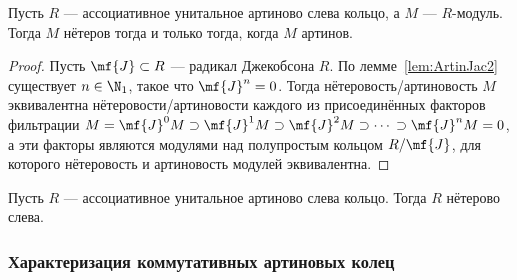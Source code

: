 \documentclass[
	extrafontsizes,
	11pt,
	hyphens,
]{memoir}
\begin{document}
%

\begin{theorem}
Пусть \(R\) --- ассоциативное унитальное артиново слева кольцо, а \(M\) --- \(R\)-мо\-дуль.
Тогда \(M\) нётеров тогда и только тогда, когда \(M\) артинов.
\end{theorem}

\begin{proof}
Пусть \(\mf{J} \subset R\) --- радикал Джекобсона \(R\).
По лемме~\ref{lem:ArtinJac2} существует \(n \in \N_1\), такое что \(\mf{J}^n = 0\).
Тогда нётеровость/артиновость \(M\) эквивалентна нётеровости/артиновости каждого из присоединённых факторов фильтрации \(M = \mf{J}^0 M \supset \mf{J}^1 M \supset \mf{J}^2 M \supset \cdots{} \supset \mf{J}^n M = 0\), а эти факторы являются модулями над полупростым кольцом \(R / \mf{J}\), для которого нётеровость и артиновость модулей эквивалентна.
\end{proof}

\begin{corollary}
Пусть \(R\) --- ассоциативное унитальное артиново слева кольцо. Тогда \(R\) нётерово слева.
\end{corollary}

\subsubsection{Характеризация коммутативных артиновых колец}

%
\end{document}

